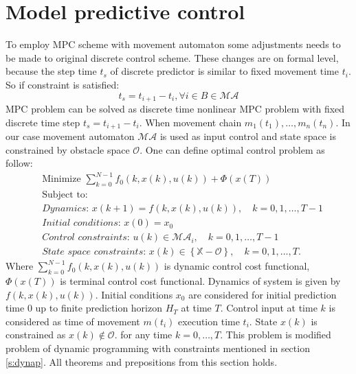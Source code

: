 \newpage\section{Model predictive control}
\noindent To employ MPC scheme with movement automaton some adjustments needs to be made to original discrete control scheme. These changes are on formal level, because the step time $t_s$ of discrete predictor is similar to fixed movement time $t_i$. So if constraint is satisfied:
\begin{equation}
    t_s = t_{i+1}-t_i, \forall i \in B\in\mathscr{MA} 
\end{equation}
\noindent MPC problem can be solved as discrete time nonlinear MPC problem with fixed discrete time step $t_s = t_{i+1}-t_i$. When movement chain $m_1(t_1),\dots,m_n(t_n)$.
In our case movement automaton $\mathscr{MA}$ is used as input control and state space is constrained by obstacle space $\mathscr{O}$. One can define optimal control problem as follow:
\begin{equation}\label{eq:minProblem}
    \begin{split}
        &\text{Minimize } \sum_{k=0}^{N-1} f_0(k,x(k),u(k)) + \Phi(x(T))\\
        &\text{Subject to: }\\
        &\textit{Dynamics: } x(k+1) = f(k,x(k),u(k)),\quad
        k = 0,1,\dots,T-1\\
        &\textit{Initial conditions: } x(0)= x_0\\
        &\textit{Control constraints: } u(k)\in\mathscr{MA}_i,\quad k = 0,1,\dots
        , T-1\\
        &\textit{State space constraints: } x(k)\in\left\{\mathbb{X}-\mathscr{O}\right\},\quad k = 0,1,\dots
        , T.
    \end{split}
\end{equation}
\noindent Where $\sum_{k=0}^{N-1} f_0(k,x(k),u(k))$ is dynamic control cost functional, $\Phi(x(T))$ is terminal control cost functional. Dynamics of system is given by $f(k,x(k),u(k))$. Initial conditions $x_0$ are considered for initial prediction time $0$ up to finite prediction horizon $H_T$ at time $T$. Control input at time $k$ is considered as time of movement $m(t_i)$ execution time $t_i$. State $x(k)$ is constrained as $x(k)\notin\mathscr{O}$. for any time $k=0,\dots,T$. This problem is modified problem of dynamic programming with constraints mentioned in section \ref{s:dynap}. All theorems and prepositions from this section holds. 

